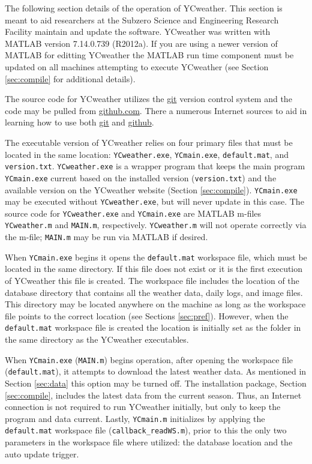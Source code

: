  \label{sec:advanced}
The following section details of the operation of YCweather.  This section is meant to aid researchers at the Subzero Science and Engineering Research Facility maintain and update the software.  YCweather was written with MATLAB version 7.14.0.739 (R2012a).  If you are using a newer version of MATLAB for editting YCweather the MATLAB run time component must be updated on all machines attempting to execute YCweather (see Section \ref{sec:compile} for additional details).

The source code for YCweather utilizes the \href{http://git-scm.com/}{git} version control system and the code may be pulled from \href{https://github.com/aeslaughter/YCweather}{github.com}. There a numerous Internet sources to aid in learning how to use both \href{http://git-scm.com/}{git} and \href{https://github.com/}{github}.

The executable version of YCweather relies on four primary files that must be located in the same location: \texttt{YCweather.exe}, \texttt{YCmain.exe}, \texttt{default.mat}, and \texttt{version.txt}.  \texttt{YCweather.exe} is a wrapper program that keeps the main program \texttt{YCmain.exe} current based on the installed version (\texttt{version.txt}) and the available version on the YCweather website (Section \ref{sec:compile}).  \texttt{YCmain.exe} may be executed without \texttt{YCweather.exe}, but will never update in this case.  The source code for \texttt{YCweather.exe} and \texttt{YCmain.exe} are MATLAB m-files \texttt{YCweather.m} and \texttt{MAIN.m}, respectively.  \texttt{YCweather.m} will not operate correctly via the m-file; \texttt{MAIN.m} may be run via MATLAB if desired.

When \texttt{YCmain.exe} begins it opens the \texttt{default.mat} workspace file, which must be located in the same directory.  If this file does not exist or it is the first execution of YCweather this file is created.  The workspace file includes the location of the database directory that contains all the weather data, daily logs, and image files.  This directory may be located anywhere on the machine as long as the workspace file points to the correct location (see Sections \ref{sec:pref}).  However, when the \texttt{default.mat} workspace file is created the location is initially set as the  folder in the same directory as the YCweather executables.

When \texttt{YCmain.exe} (\texttt{MAIN.m}) begins operation, after opening the workspace file (\texttt{default.mat}), it attempts to download the latest weather data.  As mentioned in Section \ref{sec:data} this option may be turned off.  The installation package, Section \ref{sec:compile}, includes the latest data from the current season.  Thus, an Internet connection is not required to run YCweather initially, but only to keep the program and data current.  Lastly, \texttt{YCmain.m} initializes by applying the \texttt{default.mat} workspace file (\texttt{callback\_readWS.m}), prior to this the only two parameters in the workspace file where utilized: the database location and the auto update trigger.

